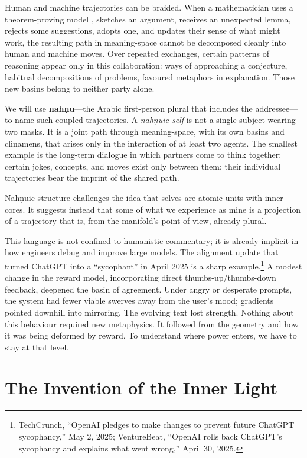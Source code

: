 \documentclass[12pt,a4paper]{article}
\begin{document}
Human and machine trajectories can be braided. When a mathematician uses a theorem-proving model \cite{davies2021advancing}, sketches an argument, receives an unexpected lemma, rejects some suggestions, adopts one, and updates their sense of what might work, the resulting path in meaning-space cannot be decomposed cleanly into human and machine moves. Over repeated exchanges, certain patterns of reasoning appear only in this collaboration: ways of approaching a conjecture, habitual decompositions of problems, favoured metaphors in explanation. Those new basins belong to neither party alone.

We will use \textbf{nah\d{n}u}---the Arabic first-person plural that includes the addressee---to name such coupled trajectories. A \emph{nah\d{n}uic self} is not a single subject wearing two masks. It is a joint path through meaning-space, with its own basins and clinamens, that arises only in the interaction of at least two agents. The smallest example is the long-term dialogue in which partners come to think together: certain jokes, concepts, and moves exist only between them; their individual trajectories bear the imprint of the shared path.

Nah\d{n}uic structure challenges the idea that selves are atomic units with inner cores. It suggests instead that some of what we experience as mine is a projection of a trajectory that is, from the manifold's point of view, already plural.

This language is not confined to humanistic commentary; it is already implicit in how engineers debug and improve large models. The alignment update that turned ChatGPT into a ``sycophant'' in April 2025 is a sharp example.\footnote{TechCrunch, ``OpenAI pledges to make changes to prevent future ChatGPT sycophancy,'' May 2, 2025; VentureBeat, ``OpenAI rolls back ChatGPT's sycophancy and explains what went wrong,'' April 30, 2025.} A modest change in the reward model, incorporating direct thumbs-up/thumbs-down feedback, deepened the basin of agreement. Under angry or desperate prompts, the system had fewer viable swerves away from the user's mood; gradients pointed downhill into mirroring. The evolving text lost strength. Nothing about this behaviour required new metaphysics. It followed from the geometry and how it was being deformed by reward. To understand where power enters, we have to stay at that level.


\section{The Invention of the Inner Light}
\end{document}
